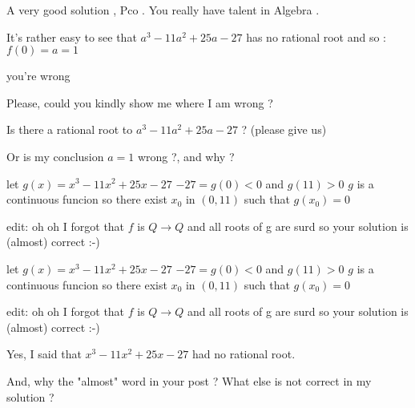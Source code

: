 \begin{mysolution}
	\begin{italicized}A very good solution , Pco . You really have talent in Algebra .  \end{italicized}
\end{mysolution}



\begin{mysolution}
	\begin{tcolorbox}
It's rather easy to see that $ a^3 - 11a^2 + 25a - 27$ has no rational root and so :
$ \boxed{f(0) = a = 1}$\end{tcolorbox}you're wrong
\end{mysolution}



\begin{mysolution}

Please, could you kindly show me where I am wrong ?

Is there a rational root to $ a^3 - 11a^2 + 25a - 27$ ? (please give us)

Or is my conclusion $ a=1$ wrong ?, and why ?
\end{mysolution}



\begin{mysolution}
	let $ g(x) = x^3 - 11x^2 + 25x - 27$
$ - 27 = g(0) < 0$
and
$ g(11) > 0$
$ g$ is a continuous funcion so there exist $ x_0$ in $ (0,11)$ such that $ g(x_0) = 0$

edit: oh oh I forgot that  $ f$ is $ Q\to Q$  and all roots of g are surd so your solution is (almost) correct :-)
\end{mysolution}



\begin{mysolution}
	\begin{tcolorbox}let $ g(x) = x^3 - 11x^2 + 25x - 27$
$ - 27 = g(0) < 0$
and
$ g(11) > 0$
$ g$ is a continuous funcion so there exist $ x_0$ in $ (0,11)$ such that $ g(x_0) = 0$

edit: oh oh I forgot that  $ f$ is $ Q\to Q$  and all roots of g are surd so your solution is (almost) correct :-)\end{tcolorbox}

Yes, I said that $ x^3 - 11x^2 + 25x - 27$ had no rational root.

And, why the "almost" word in your post ?
What else is not correct in my solution ?
\end{mysolution}



